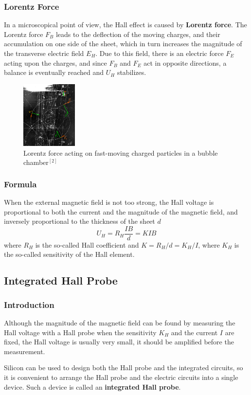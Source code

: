 \documentclass[a4paper]{article}
\begin{document}
\subsubsection{Lorentz Force}
\par In a microscopical point of view, the Hall effect is caused by \textbf{Lorentz force}. The Lorentz force $ F_B $ leads to the deflection of the moving charges,
and their accumulation on one side of the sheet, which in turn increases the magnitude of the transverse electric field $ E_H $. Due to this field, there is an electric
force $ F_E $ acting upon the charges, and since $ F_B $ and $ F_E $ act in opposite directions, a balance is eventually reached and $ U_H $ stabilizes.
\begin{figure}[!htbp]
	\centering
	\includegraphics[width=0.25\textwidth]{Lorentz_force_on_charged_particles_in_bubble_chamber.png}
	\caption{Lorentz force acting on fast-moving charged particles in a bubble chamber$^{[2]}$}
\end{figure}
\subsubsection{Formula}
\par When the external magnetic field is not too strong, the Hall voltage is proportional to both the current and the magnitude of the magnetic field, and inversely
proportional to the thickness of the sheet $d$
\begin{equation}
	U_H=R_H\dfrac{IB}{d}=KIB
\end{equation}
where $ R_H $ is the so-called Hall coefficient and $ K=R_H/d=K_H/I $, where $ K_H $ is the so-called sensitivity of the Hall element.

\subsection{Integrated Hall Probe}
\subsubsection{Introduction}
\par Although the magnitude of the magnetic field can be found by measuring the Hall voltage with a Hall probe when the sensitivity $K_H$ and the current $I$ are fixed,
the Hall voltage is usually very small, it should be amplified before the measurement.
\par Silicon can be used to design both the Hall probe and the integrated circuits, so it is convenient to arrange the Hall probe and the electric circuits into a single
device. Such a device is called an \textbf{integrated Hall probe}.
\end{document}
